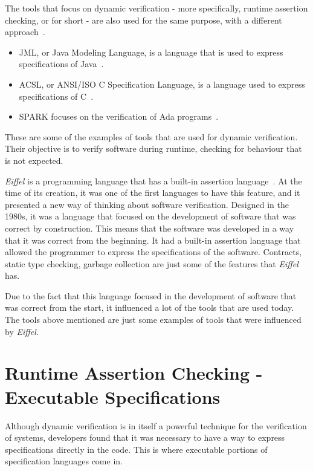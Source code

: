 The tools that focus on dynamic verification - more specifically, runtime assertion checking, 
or \rac for short - are also used for the same purpose, with a different approach~\cite{Maurica2018}.
\begin{itemize}
  \item JML, or Java Modeling Language, is a language that is used to express specifications of Java~\cite{Leavens2008}.
  \item ACSL, or ANSI/ISO C Specification Language, is a language used to express specifications of C~\cite{Baudin}.
  \item SPARK focuses on the verification of Ada programs~\cite{Spark2022}.
\end{itemize}
These are some of the examples of tools that are used for dynamic verification. Their objective 
is to verify software during runtime, checking for behaviour that is not expected.

\textit{Eiffel} is a programming language that has a built-in assertion language~\cite{Maurica2018}. 
At the time of its creation, it was one of the first languages to have this feature, and it presented 
a new way of thinking about software verification. Designed in the 1980s, it was a language that 
focused on the development of software that was correct by construction. This means that the 
software was developed in a way that it was correct from the beginning. It had a built-in assertion 
language that allowed the programmer to express the specifications of the software. Contracts, 
static type checking, garbage collection are just some of the features that \textit{Eiffel} has. 

Due to the fact that this language focused in the development of software that was correct from the 
start, it influenced a lot of the tools that are used today. The tools above mentioned are 
just some examples of tools that were influenced by \textit{Eiffel}.

\section{Runtime Assertion Checking - Executable Specifications}
\label{sec:runtime_assertion_checking_executable_specifications}

Although dynamic verification is in itself a powerful technique for the verification of systems, 
developers found that it was necessary to have a way to express specifications directly in the 
code. This is where executable portions of specification languages come in. 

